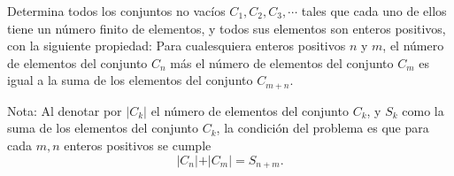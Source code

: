 Determina todos los conjuntos no vacíos $C_1, C_2, C_3, \cdots $ tales que cada uno de ellos tiene un número finito de elementos, y todos sus elementos son enteros positivos, con la siguiente propiedad: Para cualesquiera enteros positivos $n$ y $m$, el número de elementos del conjunto $C_n$ más el número de elementos del conjunto $C_m$ es igual a la suma de los elementos del conjunto $C_{m + n}$.

Nota: Al denotar por $\lvert C_k \lvert$ el número de elementos del conjunto $C_k$, y $S_k$ como la suma de los elementos del conjunto $C_k$, la condición del problema es que para cada $m,n$ enteros positivos se cumple
\[\lvert C_n \lvert + \lvert C_m \lvert = S_{n + m}.\]